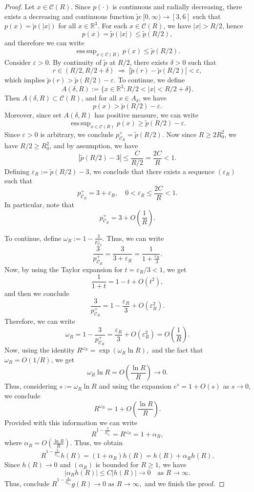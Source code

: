 \documentclass[10pt,a4paper]{amsart}
\begin{document}
\begin{proof} 
Let $x\in\mathcal{C}( R) $. 
Since $p(\cdot)$ is continuous and radially decreasing, there exists a decreasing and continuous function
$\tilde{p} : [0, \infty) \to [3, 6]$ such that $ p(x) = \tilde{p}(|x|) $ for all $ x \in \mathbb{R}^3 $.
For each $ x \in\mathcal{C}( R)  $, we have $|x| > R/2$, hence
\[
p(x) = \tilde{p}(|x|) \leq \tilde{p}(R/2),
\]
and therefore we can  write
\[
\operatorname{ess\,sup}_{x \in\mathcal{C}( R) } p(x) \leq \tilde{p}(R/2).
\]
Consider $\varepsilon > 0$. By continuity of $\tilde{p}$ at $R/2$, there exists $\delta > 0$ such that
\[
r \in (R/2, R/2 + \delta) \;\Rightarrow\; |\tilde{p}(r) - \tilde{p}(R/2)| < \varepsilon,
\]
which implies $\tilde{p}(r) > \tilde{p}(R/2) - \varepsilon$.
To continue, we define
\[
A(\delta,R) := \{x \in \mathbb{R}^3 : R/2 < |x| < R/2 + \delta\}.
\]
Then $A(\delta,R) \subset\mathcal{C}( R) $, and for all $x \in A_\delta$, we have
\[
p(x) > \tilde{p}(R/2) - \varepsilon.
\]
Moreover, since set $A(\delta,R)$ has positive measure,   we can write
\[
\operatorname{ess\,sup}_{x \in\mathcal{C}( R) } p(x) \geq \tilde{p}(R/2) - \varepsilon.
\]
Since $\varepsilon>0$ is arbitrary, we conclude
$
p_{\mathcal{C}_R}^+ = \tilde{p}(R/2).
$ 
Now since $R \geq 2R_0^2$, we have $R/2 \geq R_0^2$, and by assumption, we have 
\[
\left| \tilde p(R/2) - 3 \right| \leq \frac{C}{R/2} = \frac{2C}{R}<1.
\]
Defining $\varepsilon_R := \tilde p(R/2) - 3$, we conclude  
that there exists a sequence $(\varepsilon_R)$ such that
\[
p_{\mathcal{C}_R}^+ = 3 + \varepsilon_R, 
\quad 0<\varepsilon_R \le \frac{2C}{R}<1.
\]
In particular, note that 
\[
p_{\mathcal{C}_R}^+ = 3 + O\!\left( \frac{1}{R}\right).
\]

To continue, define $
\omega_R := 1 - \frac{3}{p_{\mathcal{C}_R}^+}$.   Thus, we can write 
\[
\frac{3}{p_{\mathcal{C}_R}^+}
= \frac{3}{3 + \varepsilon_R}
= \frac{1}{1 + \frac{\varepsilon_R}{3}}.
\]
Now, by using the Taylor expansion for $t = \varepsilon_R/3 < 1$, we get 
\[
\frac{1}{1+t} = 1 - t + O(t^2),
\]
and then we conclude 
\[
\frac{3}{p_{\mathcal{C}_R}^+}
= 1 - \frac{\varepsilon_R}{3} + O(\varepsilon_R^2).
\]
Therefore, we can write 
\[
\omega_R
= 1 - \frac{3}{p_{\mathcal{C}_R}^+}
= \frac{\varepsilon_R}{3} + O(\varepsilon_R^2)
= O\!\left(\frac{1}{R}\right).
\]
Now, using the identity 
$
R^{\omega_R} = \exp(\omega_R \ln R),
$ 
and the fact that $\omega_R = O(1/R)$, we get
\[
\omega_R \ln R = O\!\left(\frac{\ln R}{R}\right) \to 0.
\]
Thus, considering $s:=\omega_R \ln R$ and using the expansion $e^s = 1 + O(s)$ as $s \to 0$, we conclude
\[
R^{\omega_R} = 1 + O\!\left(\frac{\ln R}{R}\right).
\]
Provided with this information   we can write
\[
R^{1 - \frac{3}{p_{\mathcal{C}_R}^+}} = R^{\omega_R}
= 1 + \alpha_R,
\]
where $\alpha_R = O\!\left(\frac{\ln R}{R}\right)$.
Thus, we obtain 
\[
R^{1 - \frac{3}{p_{\mathcal{C}_R}^+}} h(R)
= (1 + \alpha_R) h(R)
= h(R) + \alpha_R h(R).
\]
Since $h(R) \to 0$ and $(\alpha_R)$ is bounded for $R \geq 1$, we have
\[
|\alpha_R h(R)| \le C |h(R)| \to 0 \quad \text{as } R \to \infty.
\]
Thus, conclude 
$ 
R^{1 - \frac{3}{p_{\mathcal{C}_R}^+}} g(R) \to 0   \text{ as } R \to \infty,
$ 
and we finish the proof. 
\end{proof}
\end{document}
